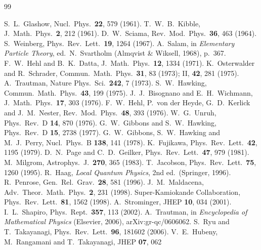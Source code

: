 \documentclass[11pt]{article}
\theoremstyle{definition}
\begin{document}
\begin{thebibliography}{99}\small

S.~L.~Glashow, Nucl.\ Phys.\ \textbf{22}, 579 (1961).
T.~W.~B.~Kibble, J.\ Math.\ Phys.\ \textbf{2}, 212 (1961).
D.~W.~Sciama, Rev.\ Mod.\ Phys.\ \textbf{36}, 463 (1964).
S.~Weinberg, Phys.\ Rev.\ Lett.\ \textbf{19}, 1264 (1967).
A.~Salam, in \emph{Elementary Particle Theory}, ed.\ N.~Svartholm
(Almqvist \& Wiksell, 1968), p.~367.
F.~W.~Hehl and B.~K.~Datta, J.\ Math.\ Phys.\ \textbf{12}, 1334 (1971).
K.~Osterwalder and R.~Schrader, Commun.\ Math.\ Phys.\ \textbf{31}, 83
(1973); II, \textbf{42}, 281 (1975).
A.~Trautman, Nature Phys.\ Sci.\ \textbf{242}, 7 (1973).
S.~W.~Hawking, Commun.\ Math.\ Phys.\ \textbf{43}, 199 (1975).
J.~J.~Bisognano and E.~H.~Wichmann, J.\ Math.\ Phys.\ \textbf{17}, 303
(1976).
F.~W.~Hehl, P.~von der Heyde, G.~D.~Kerlick and J.~M.~Nester,
Rev.\ Mod.\ Phys.\ \textbf{48}, 393 (1976).
W.~G.~Unruh, Phys.\ Rev.\ D \textbf{14}, 870 (1976).
G.~W.~Gibbons and S.~W.~Hawking, Phys.\ Rev.\ D \textbf{15}, 2738 (1977).
G.~W.~Gibbons, S.~W.~Hawking and M.~J.~Perry, Nucl.\ Phys.\ B
\textbf{138}, 141 (1978).
K.~Fujikawa, Phys.\ Rev.\ Lett.\ \textbf{42}, 1195 (1979).
D.~N.~Page and C.~D.~Geilker, Phys.\ Rev.\ Lett.\ \textbf{47}, 979
(1981).
M.~Milgrom, Astrophys.\ J.\ \textbf{270}, 365 (1983).
T.~Jacobson, Phys.\ Rev.\ Lett.\ \textbf{75}, 1260 (1995).
R.~Haag, \emph{Local Quantum Physics}, 2nd ed.\ (Springer, 1996).
R.~Penrose, Gen.\ Rel.\ Grav.\ \textbf{28}, 581 (1996).
J.~M.~Maldacena, Adv.\ Theor.\ Math.\ Phys.\ \textbf{2}, 231 (1998).
Super-Kamiokande Collaboration, Phys.\ Rev.\ Lett.\ \textbf{81}, 1562
(1998).
A.~Strominger, JHEP \textbf{10}, 034 (2001).
I.~L.~Shapiro, Phys.\ Rept.\ \textbf{357}, 113 (2002).
A.~Trautman, in \emph{Encyclopedia of Mathematical Physics} (Elsevier,
2006), arXiv:gr-qc/0606062.
S.~Ryu and T.~Takayanagi, Phys.\ Rev.\ Lett.\ \textbf{96}, 181602 (2006).
V.~E.~Hubeny, M.~Rangamani and T.~Takayanagi, JHEP \textbf{07}, 062

\end{thebibliography}
\end{document}
